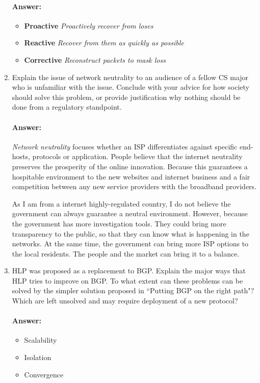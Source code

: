 \documentclass[a4paper,11pt]{article}
\theoremstyle{mytheor}
\begin{document}
\begin{enumerate}
\paragraph{Answer:}
\begin{itemize}
\item \textbf{Proactive} \emph{Proactively recover from loses}
\item \textbf{Reactive} \emph{Recover from them as quickly as possible}
\item \textbf{Corrective} \emph{Reconstruct packets to mask loss}
\end{itemize}
\item
Explain the issue of network neutrality to an audience of a fellow CS major who is unfamiliar with the issue.
Conclude with your advice for how society should solve this problem, or provide justification why nothing should be done from a regulatory standpoint.
\paragraph{Answer:}
\emph{Network neutrality} focuses whether an ISP differentiates against specific end-hosts, protocols or application.
People believe that the internet neutrality preserves the prosperity of the online innovation.
Because this guarantees a hospitable environment to the new websites and internet business and a fair competition between any new service providers with the broadband providers.

As I am from a internet highly-regulated country, I do not believe the government can always guarantee a neutral environment.
However, because the government has more investigation tools. 
They could bring more transparency to the public, so that they can know what is happening in the networks.
At the same time, the government can bring more ISP options to the local residents.
The people and the market can bring it to a balance.

\item
HLP was proposed as a replacement to BGP. 
Explain the major ways that HLP tries to improve on BGP. 
To what extent can these problems can be solved by the simpler solution proposed in ``Putting BGP on the
right path"? 
Which are left unsolved and may require deployment of a new protocol?
\paragraph{Answer:}
\begin{itemize}
\item Scalability
\item Isolation
\item Convergence
\end{itemize}

\end{enumerate}
\end{document}
